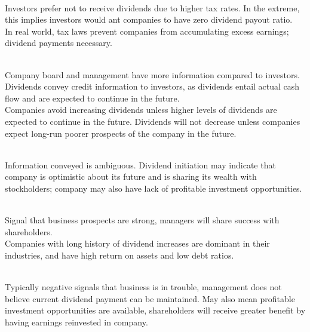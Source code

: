 \begin{remark} \\
Investors prefer not to receive dividends due to higher tax rates. In the extreme, this implies investors would ant companies to have zero dividend payout ratio.\\
In real world, tax laws prevent companies from accumulating excess earnings; dividend payments necessary.
\end{remark}

\begin{remark} \\
Company board and management have more information compared to investors. Dividends convey credit information to investors, as dividends entail actual cash flow and are expected to continue in the future.\\
Companies avoid increasing dividends unless higher levels of dividends are expected to continue in the future. Dividends will not decrease unless companies expect long-run poorer prospects of the company in the future.
\end{remark}

\begin{remark} \\
Information conveyed is ambiguous. Dividend initiation may indicate that company is optimistic about its future and is sharing its wealth with stockholders; company may also have lack of profitable investment opportunities.
\end{remark}

\begin{remark} \\
Signal that business prospects are strong, managers will share success with shareholders.\\
Companies with long history of dividend increases are dominant in their industries, and have high return on assets and low debt ratios.
\end{remark}

\begin{remark} \\
Typically negative signals that business is in trouble, management does not believe current dividend payment can be maintained. May also mean profitable investment opportunities are available, shareholders will receive greater benefit by having earnings reinvested in company.
\end{remark}

